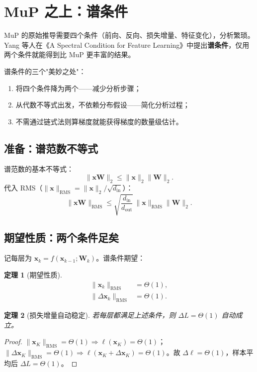 \documentclass[11pt,a4paper]{ctexart}
\newtheorem{theorem}{定理}[section]
\theoremstyle{definition}
\theoremstyle{remark}
\newcommand{\RMS}{\mathrm{RMS}}
\newcommand{\bigT}{\Theta}
\begin{document}
\section{MuP 之上：谱条件}
 
MuP 的原始推导需要四个条件（前向、反向、损失增量、特征变化），分析繁琐。Yang 等人在《A Spectral Condition for Feature Learning》中提出\textbf{谱条件}，仅用两个条件就能得到比 MuP 更丰富的结果。
 
\begin{keyinsight}
谱条件的三个"美妙之处"：
\begin{enumerate}
    \item 将四个条件降为两个——减少分析步骤；
    \item 从代数不等式出发，不依赖分布假设——简化分析过程；
    \item 不需通过链式法则算梯度就能获得梯度的数量级估计。
\end{enumerate}
\end{keyinsight}
 
\subsection{准备：谱范数不等式}
 
谱范数的基本不等式：
\begin{equation}
\|\bm{x}\bm{W}\|_2 \leq \|\bm{x}\|_2 \|\bm{W}\|_2.
\end{equation}
代入 RMS（$\|\bm{x}\|_\RMS = \|\bm{x}\|_2/\sqrt{d_\text{in}}$）：
\begin{equation}
\boxed{\|\bm{x}\bm{W}\|_\RMS \leq \sqrt{\frac{d_\text{in}}{d_\text{out}}}\, \|\bm{x}\|_\RMS \|\bm{W}\|_2.}
\label{eq:spectral-rms}
\end{equation}
 
\subsection{期望性质：两个条件足矣}
 
记每层为 $\bm{x}_k = f(\bm{x}_{k-1}; \bm{W}_k)$。谱条件期望：
 
\begin{theorem}[期望性质]
\begin{align}
\|\bm{x}_k\|_\RMS &= \bigT(1), \\
\|\Delta\bm{x}_k\|_\RMS &= \bigT(1).
\end{align}
\end{theorem}
 
\begin{theorem}[损失增量自动稳定]
若每层都满足上述条件，则 $\Delta L = \bigT(1)$ 自动成立。
\end{theorem}
\begin{proof}
$\|\bm{x}_K\|_\RMS = \bigT(1) \Rightarrow \ell(\bm{x}_K) = \bigT(1)$；$\|\Delta\bm{x}_K\|_\RMS = \bigT(1) \Rightarrow \ell(\bm{x}_K + \Delta\bm{x}_K) = \bigT(1)$。故 $\Delta\ell = \bigT(1)$，样本平均后 $\Delta L = \bigT(1)$。
\end{proof}
 
\end{document}
